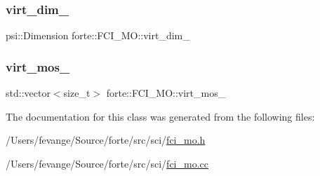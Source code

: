 \mbox{\label{classforte_1_1_f_c_i___m_o_a5646158bc2f9c310885aa276dfdf3521}} 
\subsubsection{\texorpdfstring{virt\+\_\+dim\+\_\+}{virt\_dim\_}}
{\footnotesize\ttfamily psi\+::\+Dimension forte\+::\+F\+C\+I\+\_\+\+M\+O\+::virt\+\_\+dim\+\_\+\hspace{0.3cm}{\ttfamily [protected]}}

\mbox{\label{classforte_1_1_f_c_i___m_o_ad8cb54742519982bb0c828144d08c339}} 
\subsubsection{\texorpdfstring{virt\+\_\+mos\+\_\+}{virt\_mos\_}}
{\footnotesize\ttfamily std\+::vector$<$size\+\_\+t$>$ forte\+::\+F\+C\+I\+\_\+\+M\+O\+::virt\+\_\+mos\+\_\+\hspace{0.3cm}{\ttfamily [protected]}}



The documentation for this class was generated from the following files\+:\begin{DoxyCompactItemize}
\item 
/\+Users/fevange/\+Source/forte/src/sci/\mbox{\hyperlink{fci__mo_8h}{fci\+\_\+mo.\+h}}\item 
/\+Users/fevange/\+Source/forte/src/sci/\mbox{\hyperlink{fci__mo_8cc}{fci\+\_\+mo.\+cc}}\end{DoxyCompactItemize}
